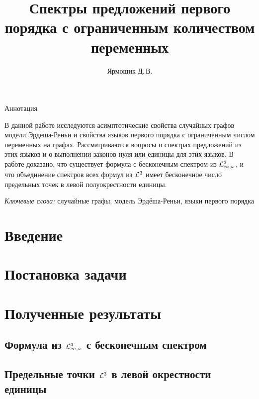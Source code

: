\documentclass{mipt-thesis-bs}
\title{Спектры предложений первого порядка с ограниченным количеством переменных}
\author{Ярмошик Д.\,В.}
\begin{document}
    \titlepage \clearpage %

\begin{center}
    {\Large Аннотация}
\end{center}

В данной работе исследуются асимптотические свойства случайных графов модели Эрдеша-Реньи и свойства языков первого порядка с ограниченным числом переменных на графах. Рассматриваются вопросы о спектрах предложений из этих языков и о выполнении законов нуля или единицы для этих языков. В работе доказано, что существует формула с бесконечным спектром из $\mathcal{L}^3_{\infty, \omega}$, и что объединение спектров всех формул из $\mathcal{L}^3$ имеет бесконечное число предельных точек в левой полуокрестности единицы.

\textit{Ключевые слова:} случайные графы, модель Эрдёша-Реньи, языки первого порядка
\clearpage

    \tableofcontents \clearpage %
    \pagestyle{miptthesis}




\section{Введение}

\newpage

\section{Постановка задачи}

\newpage

\section{Полученные результаты}
\subsection{Формула из $\mathcal{L}^3_{\infty, \omega}$ с бесконечным спектром}

\newpage

\subsection{Предельные точки $\mathcal{L}^3$ в левой окрестности единицы}
\label{sec:triangles}

\newpage
\end{document}
